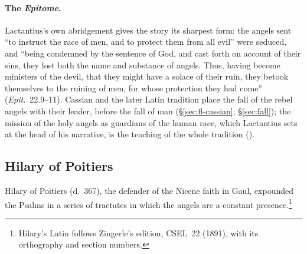 \paragraph{The \emph{Epitome}.} Lactantius's own abridgement gives the
story its sharpest form: the angels sent ``to instruct the race of men,
and to protect them from all evil'' were seduced, and ``being condemned by
the sentence of God, and cast forth on account of their sins, they lost
both the name and substance of angels. Thus, having become ministers of
the devil, that they might have a solace of their ruin, they betook
themselves to the ruining of men, for whose protection they had come''
(\emph{Epit.}\ 22.9--11). Cassian and the later Latin tradition place the fall
of the rebel angels with their leader, before the fall of man
(\S\ref{sec:fl-cassian}; \S\ref{sec:fall}); the mission of the holy angels as
guardians of the human race, which Lactantius sets at the head of his
narrative, is the teaching of the whole tradition ().

\sectionguard
\subsection{Hilary of Poitiers}\label{sec:fl-hilary}

Hilary of Poitiers (d.~367), the defender of the Nicene faith in Gaul,
expounded the Psalms in a series of tractates in which the angels are a
constant presence.\footnote{Hilary's Latin follows Zingerle's edition,
CSEL~22 (1891), with its orthography and section numbers.}

